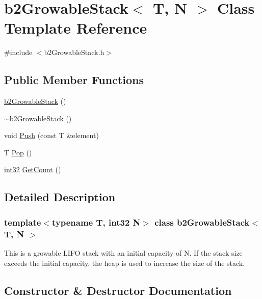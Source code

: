 \hypertarget{classb2_growable_stack}{}\section{b2\+Growable\+Stack$<$ T, N $>$ Class Template Reference}
\label{classb2_growable_stack}


{\ttfamily \#include $<$b2\+Growable\+Stack.\+h$>$}

\subsection*{Public Member Functions}
\begin{DoxyCompactItemize}
\item 
\mbox{\hyperlink{classb2_growable_stack_a8f2117cda895db13b9fed3f01e2d305d}{b2\+Growable\+Stack}} ()
\item 
\mbox{\hyperlink{classb2_growable_stack_a2b6265f7eef3e4be55b64db1f0cef4fd}{$\sim$b2\+Growable\+Stack}} ()
\item 
void \mbox{\hyperlink{classb2_growable_stack_a23661327d64ff72d1ec8d6bcdb6d8992}{Push}} (const T \&element)
\item 
T \mbox{\hyperlink{classb2_growable_stack_a53e53dcd6bff8308405a881f02957bc8}{Pop}} ()
\item 
\mbox{\hyperlink{b2_settings_8h_a43d43196463bde49cb067f5c20ab8481}{int32}} \mbox{\hyperlink{classb2_growable_stack_a3049e76ba7182b988450bfe94d30d5aa}{Get\+Count}} ()
\end{DoxyCompactItemize}


\subsection{Detailed Description}
\subsubsection*{template$<$typename T, int32 N$>$\newline
class b2\+Growable\+Stack$<$ T, N $>$}

This is a growable L\+I\+FO stack with an initial capacity of N. If the stack size exceeds the initial capacity, the heap is used to increase the size of the stack. 

\subsection{Constructor \& Destructor Documentation}
\mbox{\label{classb2_growable_stack_a8f2117cda895db13b9fed3f01e2d305d}} 
